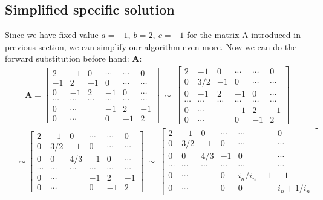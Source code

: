 \documentclass[american,a4paper,12pt]{article}
\renewcommand{\vec}[1]{\mathbf{#1}} %
\begin{document}
\subsection{Simplified specific solution}
Since we have fixed value $a = -1,\ b = 2,\ c = -1$ for the matrix A introduced in previous section, we can simplify our algorithm even more. Now we can do the forward substitution before hand:
 $\vec{A}$:
\begin{align*}
    \vec{A} =
    \begin{bmatrix}
    2 & -1 & 0 & \cdots & \cdots & 0 \\
    -1 & 2 & -1 & 0 & \cdots & \cdots \\
    0 & -1 & 2 & -1 & 0 & \cdots \\
    \cdots & \cdots & \cdots & \cdots & \cdots & \cdots \\
    0 & \cdots & & -1 & 2 & -1 \\
    0 & \cdots & & 0 & -1 & 2
    \end{bmatrix}
    \ \sim \
    \begin{bmatrix}
    2 & -1 & 0 & \cdots & \cdots & 0 \\
    0 & 3/2 & -1 & 0 & \cdots & \cdots \\
    0 & -1 & 2 & -1 & 0 & \cdots \\
    \cdots & \cdots & \cdots & \cdots & \cdots & \cdots \\
    0 & \cdots & & -1 & 2 & -1 \\
    0 & \cdots & & 0 & -1 & 2
    \end{bmatrix}
\end{align*}
\begin{align*}
    \quad \sim
    \begin{bmatrix}
    2 & -1 & 0 & \cdots & \cdots & 0 \\
    0 & 3/2 & -1 & 0 & \cdots & \cdots \\
    0 & 0 & 4/3 & -1 & 0 & \cdots \\
    \cdots & \cdots & \cdots & \cdots & \cdots & \cdots \\
    0 & \cdots & & -1 & 2 & -1 \\
    0 & \cdots & & 0 & -1 & 2
    \end{bmatrix}
    \ \sim \
    \begin{bmatrix}
    2 & -1 & 0 & \cdots & \cdots & 0 \\
    0 & 3/2 & -1 & 0 & \cdots & \cdots \\
    0 & 0 & 4/3 & -1 & 0 & \cdots \\
    \cdots & \cdots & \cdots & \cdots & \cdots & \cdots \\
    0 & \cdots & & 0 & i_n/{i_n-1} & -1 \\
    0 & \cdots & & 0 & 0 & {i_n+1}/i_n
    \end{bmatrix} \\
\end{align*}
\end{document}
